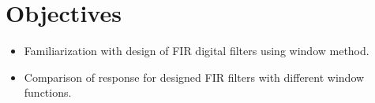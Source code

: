 \documentclass{lab_sheet}
\begin{document}
\clearpage
\tableofcontents
\clearpage
{}
{}
\listoffigures
\clearpage
{}
{}
\lstlistoflistings
\clearpage
{}
\section{Objectives}
\begin{itemize}
	\item Familiarization with design of FIR digital filters using window method.
	\item Comparison of response for designed FIR filters with different window functions.
\end{itemize}
\end{document}
